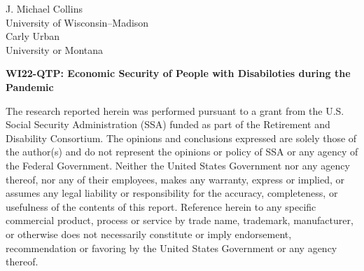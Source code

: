 \documentclass[12pt]{article}
\begin{document}
\thispagestyle{empty}
\cleardoublepage{}

\hspace{-2cm}\begin{minipage}[b]{0.3\linewidth}
\begin{flushleft}
 
\vspace{6cm}


\textsf{J.  Michael Collins} \\
\textsf{University of Wisconsin--Madison} \\
 \bigskip
\textsf{Carly Urban} \\
\textsf{University or Montana}\\
\end{flushleft}
\end{minipage}

\hspace{5cm}\begin{minipage}[t]{0.8\textwidth}
\begin{center}

\Large{\textbf{\textsf{WI22-QTP: Economic Security of People with Disabiloties during the Pandemic}}}\\
\end{center}
\end{minipage}

\hspace{5cm}\begin{minipage}[t]{0.7\textwidth}
\begin{flushleft}
\vspace{6cm}

\footnotesize{\textsf{The research reported herein was performed pursuant to a grant from the U.S. Social Security Administration (SSA) funded as part of the Retirement and Disability Consortium. The opinions and conclusions expressed are solely those of the author(s) and do not represent the opinions or policy of SSA or any agency of the Federal Government. Neither the United States Government nor any agency thereof, nor any of their employees, makes any warranty, express or implied, or assumes any legal liability or responsibility for the accuracy, completeness, or usefulness of the contents of this report. Reference herein to any specific commercial product, process or service by trade name, trademark, manufacturer, or otherwise does not necessarily constitute or imply endorsement, recommendation or favoring by the United States Government or any agency thereof.}}
\end{flushleft}

\end{minipage}
 
\end{document}
